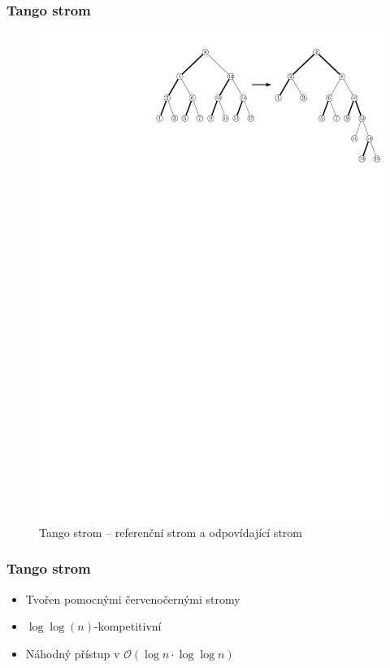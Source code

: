 \documentclass{beamer}
\begin{document}
\begin{frame}
\frametitle{Tango strom}


\begin{figure}[h!]

  \centering
  \includegraphics[width=.9\linewidth]{tango}
\caption{Tango strom -- referenční strom a odpovídající  strom} 

\label{obr:cut_tango} 
 
\end{figure}
\end{frame}


\begin{frame}
\frametitle{Tango strom}
\begin{itemize}
\item Tvořen pomocnými červenočernými stromy
\item $\log\log(n)$-kompetitivní
\item Náhodný přístup v $\mathcal O(\log n \cdot \log\log n)$
\end{itemize}
\end{frame}
\end{document}
